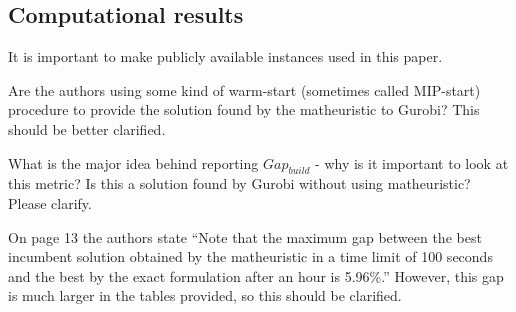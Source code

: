 \documentclass{article}
\newenvironment{reviewer}{\setcounter{pointcounter}{1}}{}
\newcommand{\point}{\text{{\selectfont \thepointcounter} \stepcounter{pointcounter}}}
\begin{document}
\begin{reviewer}
		
		\subsection*{Computational results}
		
		\begin{itshape}
			It is important to make publicly available instances used in this paper.
		\end{itshape}
		
		\begin{tcolorbox}[breakable,enhanced,coltitle=black,colback=green!5!white,colframe=green!75!black,title=\textbf{Answer R2.\point},borderline={1pt}{0pt}{black},boxrule=0pt]
			
		\end{tcolorbox}
		
		\begin{itshape}
			Are the authors using some kind of warm-start (sometimes called MIP-start) procedure to provide the solution found by the matheuristic to Gurobi? This should be better clarified.
		\end{itshape}
		
		\begin{tcolorbox}[breakable,enhanced,coltitle=black,colback=green!5!white,colframe=green!75!black,title=\textbf{Answer R2.\point},borderline={1pt}{0pt}{black},boxrule=0pt]

 		\end{tcolorbox}
		
		\begin{itshape}
			What is the major idea behind reporting $Gap_{build}$ - why is it important to look at this metric? Is this a solution found by Gurobi without using matheuristic? Please clarify.
		\end{itshape}

		\begin{tcolorbox}[breakable,enhanced,coltitle=black,colback=green!5!white,colframe=green!75!black,title=\textbf{Answer R2.\point},borderline={1pt}{0pt}{black},boxrule=0pt]
	
		\end{tcolorbox}

		\begin{itshape}
			On page 13 the authors state ``Note that the maximum gap between the best incumbent solution obtained by the matheuristic in a time limit of 100 seconds and the best by the exact formulation after an hour is 5.96\%.'' However, this gap is much larger in the tables provided, so this should be clarified.
		\end{itshape}


\end{reviewer}
\end{document}
